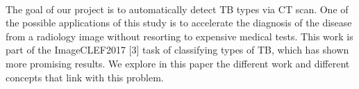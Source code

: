 \paragraph{}
The goal of our project is to automatically detect TB types via CT scan. One of the possible applications of this study is to accelerate the diagnosis of the disease from a radiology image without resorting to expensive medical tests. This work is part of the ImageCLEF2017 [3] task of classifying types of TB, which has shown more promising results. We explore in this paper the different work and different concepts that link with this problem.